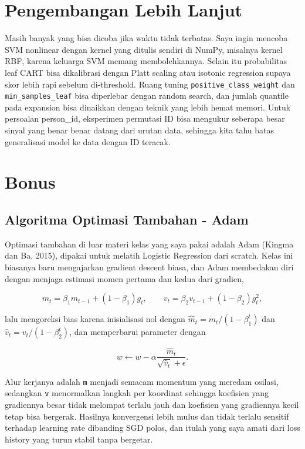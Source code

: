 \documentclass[10pt,a4paper]{article}
\begin{document}
\section{Pengembangan Lebih Lanjut}

Masih banyak yang bisa dicoba jika waktu tidak terbatas. Saya ingin mencoba SVM nonlinear dengan kernel yang ditulis sendiri di NumPy, misalnya kernel RBF, karena keluarga SVM memang membolehkannya. Selain itu probabilitas leaf CART bisa dikalibrasi dengan Platt scaling atau isotonic regression supaya skor lebih rapi sebelum di-threshold. Ruang tuning \texttt{positive\_class\_weight} dan \texttt{min\_samples\_leaf} bisa diperlebar dengan random search, dan jumlah quantile pada expansion bisa dinaikkan dengan teknik yang lebih hemat memori. Untuk persoalan person\_id, eksperimen permutasi ID bisa mengukur seberapa besar sinyal yang benar benar datang dari urutan data, sehingga kita tahu batas generalisasi model ke data dengan ID teracak.

\section{Bonus}

\subsection{Algoritma Optimasi Tambahan - Adam}

Optimasi tambahan di luar materi kelas yang saya pakai adalah Adam (Kingma dan Ba, 2015), dipakai untuk melatih Logistic Regression dari scratch. Kelas ini biasanya baru mengajarkan gradient descent biasa, dan Adam membedakan diri dengan menjaga estimasi momen pertama dan kedua dari gradien,

\[
m_t=\beta_1 m_{t-1}+(1-\beta_1)g_t,\qquad
v_t=\beta_2 v_{t-1}+(1-\beta_2)g_t^2,
\]

lalu mengoreksi bias karena inisialisasi nol dengan $\hat m_t=m_t/(1-\beta_1^t)$ dan $\hat v_t=v_t/(1-\beta_2^t)$, dan memperbarui parameter dengan

\[
w \leftarrow w-\alpha\frac{\hat m_t}{\sqrt{\hat v_t}+\epsilon}.
\]

Alur kerjanya adalah \texttt{m} menjadi semacam momentum yang meredam osilasi, sedangkan \texttt{v} menormalkan langkah per koordinat sehingga koefisien yang gradiennya besar tidak melompat terlalu jauh dan koefisien yang gradiennya kecil tetap bisa bergerak. Hasilnya konvergensi lebih mulus dan tidak terlalu sensitif terhadap learning rate dibanding SGD polos, dan itulah yang saya amati dari loss history yang turun stabil tanpa bergetar.
\end{document}
